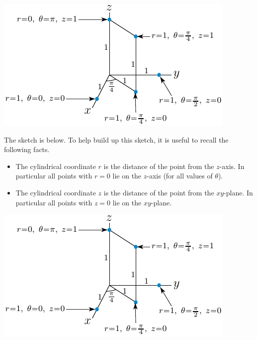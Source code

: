 %

\begin{answer}
\begin{center}
   \includegraphics{fig/cylP1.pdf}
\end{center}
\end{answer}

\begin{solution}
The sketch is below. To help build up this sketch, it is useful to 
recall the following facts.
\begin{itemize}
\item
The cylindrical coordinate $r$ is the distance of the point from the $z$-axis.
In particular all points with $r=0$ lie on the $z$-axis (for all values of $\theta$).
\item
The cylindrical coordinate $z$ is the distance of the point from the $xy$-plane.
In particular all points with $z=0$ lie on the $xy$-plane.
\end{itemize}
\begin{center}
   \includegraphics{fig/cylP1.pdf}
\end{center}
\end{solution}

